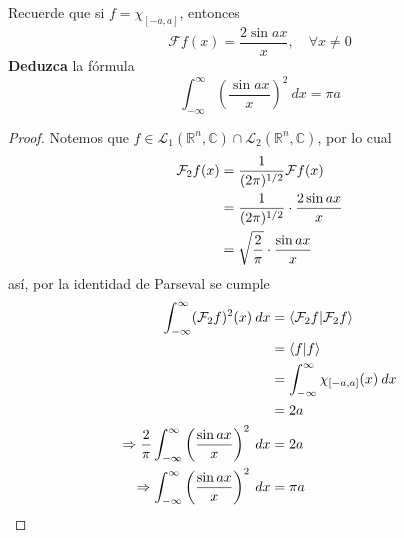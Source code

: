 \documentclass[12pt]{report}
\newcounter{it}
\theoremstyle{largebreak}
\newcommand\pint[2]{\ensuremath{\langle#1| #2\rangle}}
\newcommand{\fou}[1]{\ensuremath{\mathcal{F}#1}}
\begin{document}
    \begin{excer}
        Recuerde que si $f=\chi_{[-a,a]}$, entonces
        \begin{equation*}
            \fou{f}(x)=\frac{2\sin ax}{x},\quad\forall x\neq0
        \end{equation*}
        \textbf{Deduzca} la fórmula
        \begin{equation*}
            \int_{ -\infty}^{\infty}\left(\frac{\sin ax}{x} \right)^2\:dx=\pi a
        \end{equation*}
    \end{excer}

    \begin{proof}
        Notemos que $f\in\mathcal{L}_1(\mathbb{R}^n,\mathbb{C})\cap\mathcal{L}_2(\mathbb{R}^n,\mathbb{C})$, por lo cual
        \begin{equation*}
            \begin{split}
                \fou_2{f}(x)&=\frac{1}{(2\pi)^{1/2}}\fou{f}(x)\\
                &=\frac{1}{(2\pi)^{1/2}}\cdot\frac{2\sin ax}{x}\\
                &=\sqrt{\frac{2}{\pi}}\cdot\frac{\sin ax}{x}\\
            \end{split}
        \end{equation*}
        así, por la identidad de Parseval se cumple
        \begin{equation*}
            \begin{split}
                \int_{-\infty}^{\infty}(\fou_2{f})^2(x)\:dx&=\pint{\fou_2{f}}{\fou_2{f}}\\
                &=\pint{f}{f}\\
                &=\int_{-\infty}^\infty \chi_{[-a,a]}(x)\:dx\\
                &=2a\\
                \Rightarrow \frac{2}{\pi}\int_{ -\infty}^\infty\left(\frac{\sin ax}{x}\right)^2 \:dx&=2a\\
                \Rightarrow \int_{ -\infty}^\infty\left(\frac{\sin ax}{x}\right)^2\:dx&=\pi a\\
            \end{split}
        \end{equation*}
    \end{proof}
\end{document}
